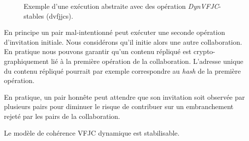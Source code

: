 \begin{figure}[htb]
\centering
{}
\caption[Stabilité \acl{VFJC} dynamique]{Exemple d'une exécution abstraite avec des opération \emph{DynVFJC}-stables (dvfjjcs).}\label{fig:dvfjcs-example}
\end{figure}

En principe un pair mal-intentionné peut exécuter une seconde opération d'invitation initiale.
Nous considérons qu'il initie alors une autre collaboration.
En pratique nous pouvons garantir qu'un contenu répliqué est crypto-graphiquement lié à la première opération de la collaboration.
L'adresse unique du contenu répliqué pourrait par exemple correspondre au \emph{hash} de la première opération.

En pratique, un pair honnête peut attendre que son invitation soit observée par plusieurs pairs pour diminuer le risque de contribuer sur un embranchement rejeté par les pairs de la collaboration.

\begin{theorem}\label{th:stabilizable-dyn-vfjc}
Le modèle de cohérence \acl{VFJC} dynamique est stabilisable.
\end{theorem}

